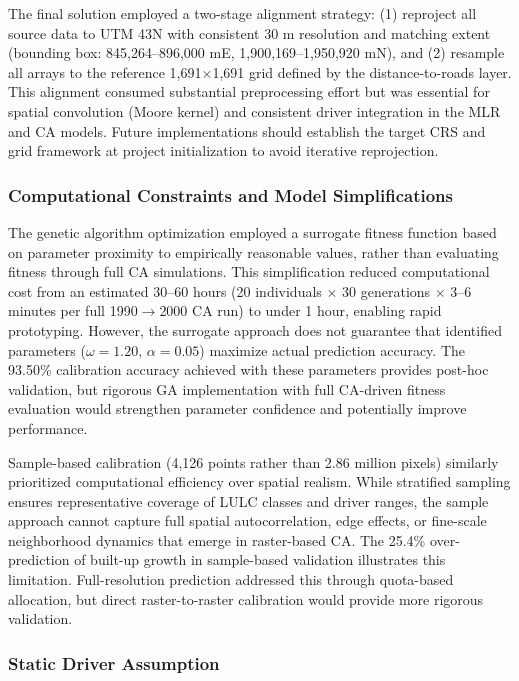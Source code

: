 \documentclass[12pt,a4paper]{article}
\begin{document}
The final solution employed a two-stage alignment strategy: (1) reproject all source data to UTM 43N with consistent 30 m resolution and matching extent (bounding box: 845,264--896,000 mE, 1,900,169--1,950,920 mN), and (2) resample all arrays to the reference 1,691$\times$1,691 grid defined by the distance-to-roads layer. This alignment consumed substantial preprocessing effort but was essential for spatial convolution (Moore kernel) and consistent driver integration in the MLR and CA models. Future implementations should establish the target CRS and grid framework at project initialization to avoid iterative reprojection.

\subsubsection{Computational Constraints and Model Simplifications}

The genetic algorithm optimization employed a surrogate fitness function based on parameter proximity to empirically reasonable values, rather than evaluating fitness through full CA simulations. This simplification reduced computational cost from an estimated 30--60 hours (20 individuals $\times$ 30 generations $\times$ 3--6 minutes per full 1990$\rightarrow$2000 CA run) to under 1 hour, enabling rapid prototyping. However, the surrogate approach does not guarantee that identified parameters ($\omega=1.20$, $\alpha=0.05$) maximize actual prediction accuracy. The 93.50\% calibration accuracy achieved with these parameters provides post-hoc validation, but rigorous GA implementation with full CA-driven fitness evaluation would strengthen parameter confidence and potentially improve performance.

Sample-based calibration (4,126 points rather than 2.86 million pixels) similarly prioritized computational efficiency over spatial realism. While stratified sampling ensures representative coverage of LULC classes and driver ranges, the sample approach cannot capture full spatial autocorrelation, edge effects, or fine-scale neighborhood dynamics that emerge in raster-based CA. The 25.4\% over-prediction of built-up growth in sample-based validation illustrates this limitation. Full-resolution prediction addressed this through quota-based allocation, but direct raster-to-raster calibration would provide more rigorous validation.

\subsubsection{Static Driver Assumption}
\end{document}
